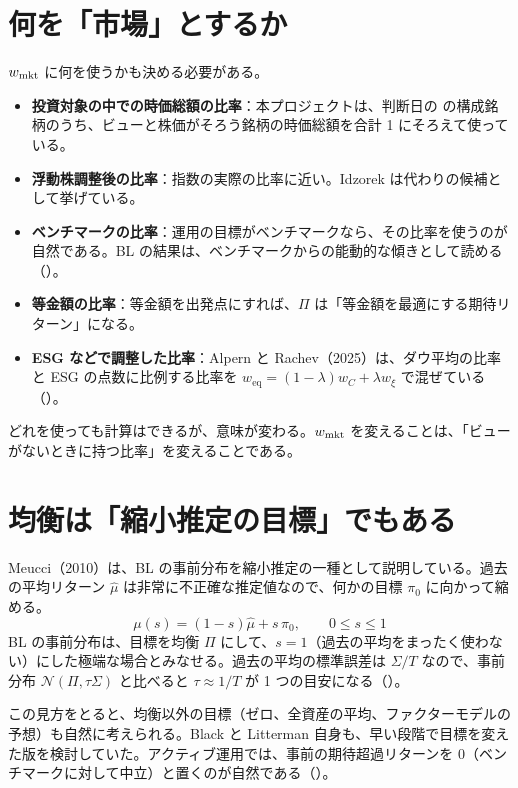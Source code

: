 \section{何を「市場」とするか}

$w_{\mathrm{mkt}}$ に何を使うかも決める必要がある。

\begin{itemize}
\item \textbf{投資対象の中での時価総額の比率}：本プロジェクトは、判断日の \SP{} の構成銘柄のうち、ビューと株価がそろう銘柄の時価総額を合計 1 にそろえて使っている。
\item \textbf{浮動株調整後の比率}：指数の実際の比率に近い。Idzorek は代わりの候補として挙げている。
\item \textbf{ベンチマークの比率}：運用の目標がベンチマークなら、その比率を使うのが自然である。BL の結果は、ベンチマークからの能動的な傾きとして読める（）。
\item \textbf{等金額の比率}：等金額を出発点にすれば、$\Pi$ は「等金額を最適にする期待リターン」になる。
\item \textbf{ESG などで調整した比率}：Alpern と Rachev（2025）は、ダウ平均の比率と ESG の点数に比例する比率を $w_{\mathrm{eq}}=(1-\lambda)w_C+\lambda w_\xi$ で混ぜている（）。
\end{itemize}

どれを使っても計算はできるが、意味が変わる。$w_{\mathrm{mkt}}$ を変えることは、「ビューがないときに持つ比率」を変えることである。

\section{均衡は「縮小推定の目標」でもある}

Meucci（2010）は、BL の事前分布を縮小推定の一種として説明している。過去の平均リターン $\hat\mu$ は非常に不正確な推定値なので、何かの目標 $\pi_0$ に向かって縮める。
\begin{equation}
\mu(s)=(1-s)\hat\mu+s\,\pi_0,\qquad 0\le s\le 1
\end{equation}
BL の事前分布は、目標を均衡 $\Pi$ にして、$s=1$（過去の平均をまったく使わない）にした極端な場合とみなせる。過去の平均の標準誤差は $\Sigma/T$ なので、事前分布 $\mathcal N(\Pi,\tau\Sigma)$ と比べると $\tau\approx1/T$ が 1 つの目安になる（）。

この見方をとると、均衡以外の目標（ゼロ、全資産の平均、ファクターモデルの予想）も自然に考えられる。Black と Litterman 自身も、早い段階で目標を変えた版を検討していた。アクティブ運用では、事前の期待超過リターンを 0（ベンチマークに対して中立）と置くのが自然である（）。

